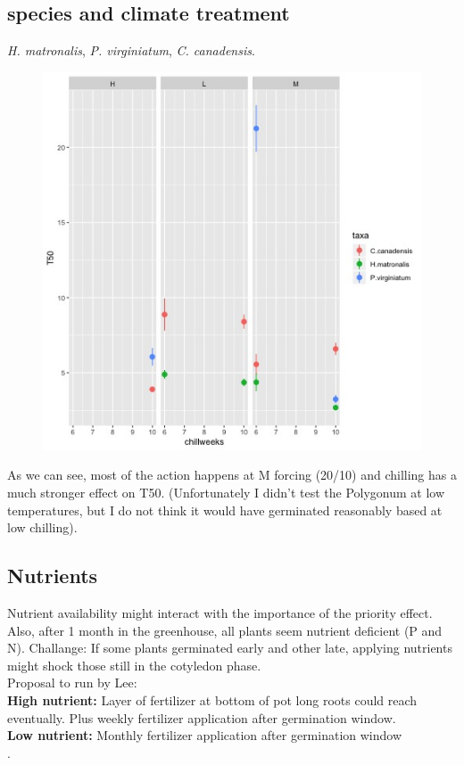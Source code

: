 \documentclass{article}\usepackage[]{graphicx}\usepackage[]{color}
\begin{document}
\subsection{species and climate treatment}
\textit{H. matronalis}, \textit{P. virginiatum}, \textit{C. canadensis}.\\

 \begin{figure}[h!]
        \centering
          \includegraphics[width=\textwidth]{prelimT50.jpeg}

    \end{figure}    

As we can see, most of the action happens at M forcing (20/10) and chilling has a much stronger effect on T50. (Unfortunately I didn't test the Polygonum at low temperatures, but I do not think it would have germinated reasonably based at low chilling).

\subsection{Nutrients}
Nutrient availability might interact with the importance of the priority effect. Also, after 1 month in the greenhouse, all plants seem nutrient deficient (P and N). Challange: If some plants germinated early and other late, applying nutrients might shock those still in the cotyledon phase.\\
Proposal to run by Lee:\\
\textbf{High nutrient:} Layer of fertilizer at bottom of pot long roots could reach eventually. Plus weekly fertilizer application after germination window.\\
\textbf{Low nutrient:} Monthly fertilizer application after germination window\\.
\end{document}
